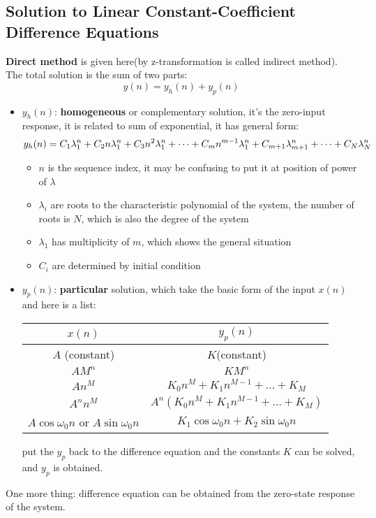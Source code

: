 \documentclass[10pt,a4paper,oneside]{article}
\begin{document}
\subsection{Solution to Linear Constant-Coefficient Difference Equations}
\textbf{Direct method} is given here(by z-transformation is called indirect method). The total solution is the sum of two parts:
\[
y(n) = y_h(n) + y_p(n)
\] 
\begin{itemize}
	\item $y_h(n)$: \textbf{homogeneous} or complementary solution, it's the zero-input response, it is related to sum of exponential, it has general form:
	\[
	y_h(n) = C_1 \lambda_1^n + C_2 n \lambda_1^n + C_3 n^2 \lambda_1^n + \cdots + C_m n^{m-1} \lambda_1^n\\
	+C_{m+1}\lambda_{m+1}^n + \cdots + C_N \lambda_N ^n
	\]
	\begin{itemize}
		\item $n$ is the sequence index, it may be confusing to put it at position of power of $\lambda$
		\item $\lambda_i$ are roots to the characteristic polynomial of the system, the number of roots is $N$, which is also the degree of the system
		\item $\lambda_1$ has multiplicity of $m$, which shows the general situation
		\item $C_i$ are determined by initial condition
	\end{itemize}
	\item $y_p(n)$: \textbf{particular} solution, which take the basic form of the input $x(n)$ and here is a list:
	
	\begin{tabular}{|c|c|}
		\hline 
		$x(n)$ & $y_p(n)$ \\ 
		\hline 
		$A$ (constant) & $K$(constant) \\ 
		$AM^n$ & $KM^n$ \\ 
		$An^M$ & $K_0 n^M + K_1 n^{M-1} + \dots+ K_M$ \\ 
		$A^n n^M$ & $A^n(K_0 n^M + K_1 n^{M-1} + \dots+ K_M)$ \\ 
		$A \cos \omega_0 n$ or $A \sin \omega_0 n$ & $K_1 \cos \omega_0 n + K_2 \sin \omega_0 n$ \\ 
		\hline 
	\end{tabular}

	put the $y_p$ back to the difference equation and the constants $K$ can be solved, and $y_p$ is obtained.
\end{itemize}
One more thing: difference equation can be obtained from the zero-state response of the system.
\end{document}
